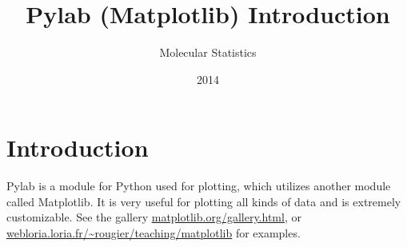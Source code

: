 \documentclass{article}
\title{Pylab (Matplotlib) Introduction}
\author{Molecular Statistics}
\date{2014}
\begin{document}







\maketitle

\section{Introduction}

Pylab is a module for Python used for plotting, which utilizes
another module called Matplotlib. It is very useful for plotting all kinds
of data and is extremely customizable.  See the gallery
\href{http://matplotlib.org/gallery.html}{matplotlib.org/gallery.html}, or
\href{http://webloria.loria.fr/~rougier/teaching/matplotlib/}{webloria.loria.fr/\~{}rougier/teaching/matplotlib}
for examples. \\
\end{document}
